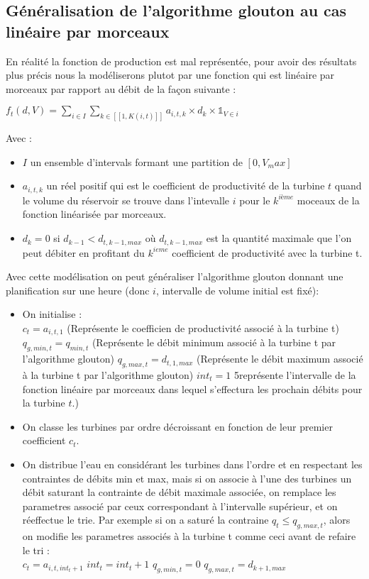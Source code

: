 \documentclass[a4paper]{report}
\begin{document}
\subsection{Généralisation de l'algorithme glouton au cas linéaire par morceaux}
En réalité la fonction de production est mal représentée, pour avoir des résultats plus précis nous la modéliserons plutot par une fonction qui est linéaire par morceaux par rapport au débit de la façon suivante :\\
\begin{center}
  $f_t(d,V)=\sum_{i\in I}\sum_{k \in [[1,K(i,t)]]} a_{i,t,k}\times d_k  \times \mathbb{1}_{V \in i }$
\end{center}
Avec :\\
\begin{itemize}
  \item $I$ un ensemble d'intervals formant une partition de $[0, V_max]$
  \item $a_{i,t,k}$ un réel positif qui est le coefficient de productivité de la turbine $t$ quand le volume du réservoir se trouve dans l'intevalle $i$ pour le $k^{ième}$ moceaux de la fonction linéarisée par morceaux.
  \item $d_k =0$ si $d_{k-1}<d_{t,k-1,max}$ où $d_{t,k-1,max}$ est la quantité maximale que l'on peut débiter en profitant du $k^{ieme}$ coefficient de productivité avec la turbine t.
\end{itemize}
 Avec cette modélisation on peut généraliser l'algorithme glouton donnant une planification sur une heure (donc $i$, intervalle de volume initial est fixé): \\
 \begin{itemize}
  
   \item On initialise :\\
    \subitem $c_t= a_{i,t,1}$ (Représente le coefficien de productivité associé à la turbine t)
   \subitem $q_{g,min,t} = q_{min,t}$ (Représente le débit minimum associé à la turbine t par l'algorithme glouton)
   \subitem $q_{g,max,t} = d_{t,1,max}$ (Représente le débit maximum associé à la turbine t par l'algorithme glouton)
	\subitem $ int_t =1$ 5représente l'intervalle de la fonction linéaire par morceaux dans lequel s'effectura les prochain débits pour la turbine $t$.)\\
     \item On classe les turbines par ordre décroissant en fonction  de leur premier coefficient $c_t$.\\
   \item On distribue l'eau en considérant les turbines dans l'ordre et en respectant les contraintes de débits min et max, mais si on associe à l'une des turbines un débit saturant la contrainte de débit maximale associée, on remplace les parametres associé par ceux correspondant à l'intervalle supérieur, et on réeffectue le trie. Par exemple si on a saturé la contraine $q_t\leq q_{g,max,t}$, alors on modifie les parametres associés à la turbine t comme ceci avant de refaire le tri :\\
   \subitem $c_t= a_{i,t,int_t+1}$
\subitem $int_t=int_t +1$
   \subitem $q_{g,min,t} = 0$
   \subitem $q_{g,max,t} = d_{k+1,max}$
    
 \end{itemize}
\end{document}

